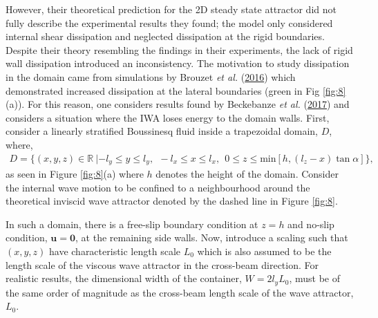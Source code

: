 \documentclass[a4paper]{article}
\numberwithin{equation}{section}
\begin{document}
However, their theoretical prediction for the 2D steady state attractor did not fully describe the experimental results they found; the model only considered internal shear dissipation and neglected dissipation at the rigid boundaries. Despite their theory resembling the findings in their experiments, the lack of rigid wall dissipation introduced an inconsistency. The motivation to study dissipation in the domain came from simulations by Brouzet \emph{et al.} (\hyperlink{ref 26}{2016}) which demonstrated increased dissipation at the lateral boundaries (green in Fig \ref{fig:8}(a)). For this reason, one considers results found by Beckebanze \emph{et al.} (\hyperlink{ref 8}{2017}) and considers a situation where the IWA loses energy to the domain walls. First, consider a linearly stratified Boussinesq fluid inside a trapezoidal domain, $D$, where, 
\begin{align*}
D = \Big\{ (x,y,z) \in \mathbb{R}~ | -l_y \leq y \leq l_y, ~~-l_x \leq x \leq l_x,~~ 0 \leq z \leq \text{min} [h, (l_z-x)\tan\alpha] \Big\},
\end{align*}
as seen in Figure \ref{fig:8}(a) where $h$ denotes the height of the domain. Consider the internal wave motion to be confined to a neighbourhood around the theoretical inviscid wave attractor denoted by the dashed line in Figure \ref{fig:8}. 

In such a domain, there is a free-slip boundary condition at $z = h$ and no-slip condition, $\mathbf{u} = \mathbf{0}$, at the remaining side walls. Now, introduce a scaling such that $(x,y,z)$ have characteristic length scale $L_0$ which is also assumed to be the length scale of the viscous wave attractor in the cross-beam direction. For realistic results, the dimensional width of the container, $W = 2l_yL_0$, must be of the same order of magnitude as the cross-beam length scale of the wave attractor, $L_0$. 
\end{document}
